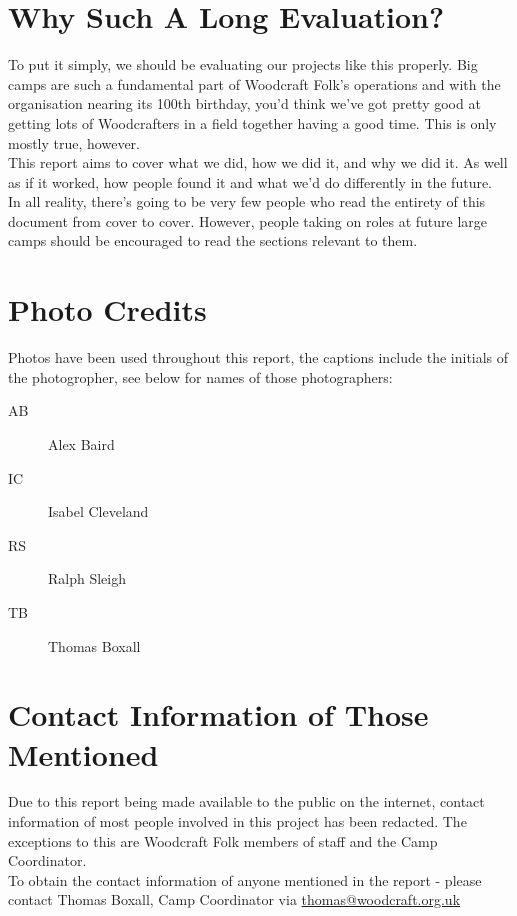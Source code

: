 \section{Why Such A Long Evaluation?}
To put it simply, we should be evaluating our projects like this properly. Big camps are such a fundamental part of Woodcraft Folk's operations and with the organisation nearing its 100th birthday, you'd think we've got pretty good at getting lots of Woodcrafters in a field together having a good time. This is only mostly true, however.\\

This report aims to cover what we did, how we did it, and why we did it. As well as if it worked, how people found it and what we'd do differently in the future. \\

In all reality, there's going to be very few people who read the entirety of this document from cover to cover. However, people taking on roles at future large camps should be encouraged to read the sections relevant to them. 

\section{Photo Credits}
Photos have been used throughout this report, the captions include the initials of the photogropher, see below for names of those photographers:
\begin{description}
    \item[AB] Alex Baird
    \item[IC] Isabel Cleveland
    \item[RS] Ralph Sleigh
    \item[TB] Thomas Boxall
\end{description}

\section{Contact Information of Those Mentioned}
Due to this report being made available to the public on the internet, contact information of most people involved in this project has been redacted. The exceptions to this are Woodcraft Folk members of staff and the Camp Coordinator.\\

To obtain the contact information of anyone mentioned in the report - please contact Thomas Boxall, Camp Coordinator via \href{mailto:thomas@woodcraft.org.uk}{thomas@woodcraft.org.uk}

